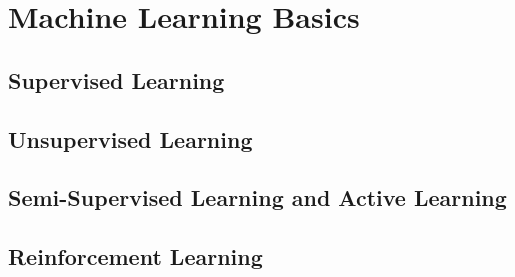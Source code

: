 \section{Machine Learning Basics}  \label{cha:foundations_basics_ml}
\subsection{Supervised Learning}
\subsection{Unsupervised Learning}
\subsection{Semi-Supervised Learning and Active Learning}
\subsection{Reinforcement Learning}